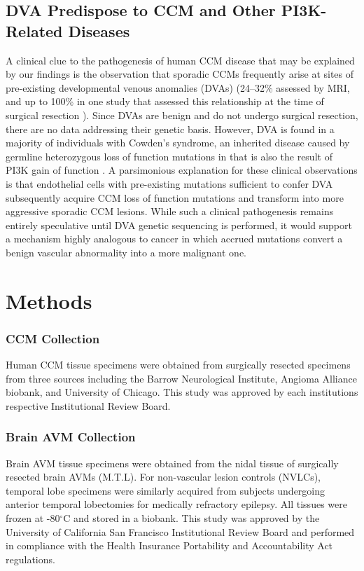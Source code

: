 \subsection{DVA Predispose to CCM and Other PI3K-Related Diseases}
A clinical clue to the pathogenesis of human CCM disease that may be explained by our findings is the observation that sporadic CCMs frequently arise at sites of pre-existing developmental venous anomalies (DVAs) (24--32\% assessed by MRI, and up to 100\% in one study that assessed this relationship at the time of surgical resection \citep{wurm2005, porter1999, abdulrauf1999}). Since DVAs are benign and do not undergo surgical resection, there are no data addressing their genetic basis.  However, DVA is found in a majority of individuals with Cowden’s syndrome, an inherited disease caused by germline heterozygous loss of function mutations in  that is also the result of PI3K gain of function \citep{dhamija2018, tan2007}.  A parsimonious explanation for these clinical observations is that endothelial cells with pre-existing  mutations sufficient to confer DVA subsequently acquire CCM loss of function mutations and transform into more aggressive sporadic CCM lesions.  While such a clinical pathogenesis remains entirely speculative until DVA genetic sequencing is performed, it would support a mechanism highly analogous to cancer in which accrued mutations convert a benign vascular abnormality into a more malignant one. 

\section{Methods}
\subsubsection{CCM Collection}
Human CCM tissue specimens were obtained from surgically resected specimens from three sources including the Barrow Neurological Institute, Angioma Alliance biobank, and University of Chicago. This study was approved by each institutions respective Institutional Review Board. 

\subsubsection{Brain AVM Collection}
Brain AVM tissue specimens were obtained from the nidal tissue of surgically resected brain AVMs (M.T.L). For non-vascular lesion controls (NVLCs), temporal lobe specimens were similarly acquired from subjects undergoing anterior temporal lobectomies for medically refractory epilepsy. All tissues were frozen at -80$^{\circ}$C and stored in a biobank. This study was approved by the University of California San Francisco Institutional Review Board and performed in compliance with the Health Insurance Portability and Accountability Act regulations.

